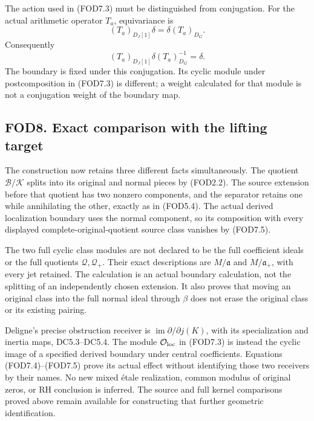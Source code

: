 The action used in (FOD7.3) must be distinguished from conjugation. For
the actual arithmetic operator \(T_a\), equivariance is \[
(T_a)_{D_J[1]}\delta=\delta(T_a)_{D_G}.
\] Consequently \[
(T_a)_{D_J[1]}\delta(T_a)_{D_G}^{-1}=\delta.
\tag{FOD7.6}
\] The boundary is fixed under this conjugation. Its cyclic module under
postcomposition in (FOD7.3) is different; a weight calculated for that
module is not a conjugation weight of the boundary map.

\subsection{FOD8. Exact comparison with the lifting
target}\label{fod8.-exact-comparison-with-the-lifting-target}

The construction now retains three different facts simultaneously. The
quotient \(\mathcal B/\mathcal K\) splits into its original and normal
pieces by (FOD2.2). The source extension before that quotient has two
nonzero components, and the separator retains one while annihilating the
other, exactly as in (FOD5.4). The actual derived localization boundary
uses the normal component, so its composition with every displayed
complete-original-quotient source class vanishes by (FOD7.5).

The two full cyclic class modules are not declared to be the full
coefficient ideals or the full quotients \(\mathcal Q,\mathcal Q_+\).
Their exact descriptions are \(M/\mathfrak a\) and \(M/\mathfrak a_+\),
with every jet retained. The calculation is an actual boundary
calculation, not the splitting of an independently chosen extension. It
also proves that moving an original class into the full normal ideal
through \(\beta\) does not erase the original class or its existing
pairing.

Deligne's precise obstruction receiver is
\(\operatorname{im}\partial/\partial j(K)\), with its specialization and
inertia maps, DC5.3--DC5.4. The module \(\mathcal O_{\rm loc}\) in
(FOD7.3) is instead the cyclic image of a specified derived boundary
under central coefficients. Equations (FOD7.4)--(FOD7.5) prove its
actual effect without identifying those two receivers by their names. No
new mixed étale realization, common modulus of original zeros, or RH
conclusion is inferred. The source and full kernel comparisons proved
above remain available for constructing that further geometric
identification.
